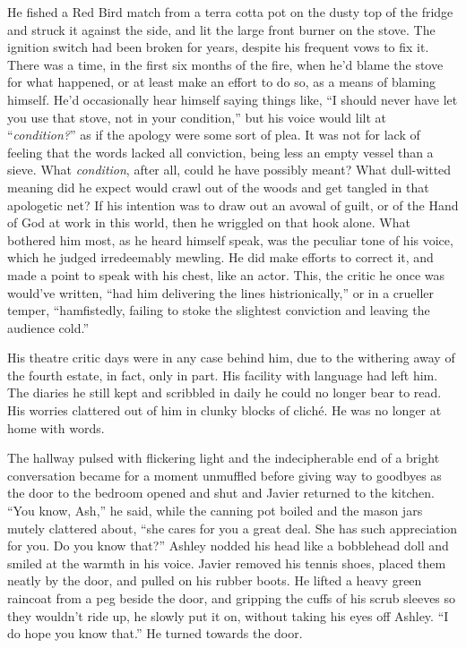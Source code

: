 \documentclass[
]{article}
\begin{document}
He fished a Red Bird match from a terra cotta pot on the dusty top of
the fridge and struck it against the side, and lit the large front
burner on the stove. The ignition switch had been broken for years,
despite his frequent vows to fix it. There was a time, in the first six
months of the fire, when he'd blame the stove for what happened, or at
least make an effort to do so, as a means of blaming himself. He'd
occasionally hear himself saying things like, ``I should never have let
you use that stove, not in your condition,'' but his voice would lilt at
``\emph{condition?}'' as if the apology were some sort of plea. It was
not for lack of feeling that the words lacked all conviction, being less
an empty vessel than a sieve. What \emph{condition}, after all, could he
have possibly meant? What dull-witted meaning did he expect would crawl
out of the woods and get tangled in that apologetic net? If his
intention was to draw out an avowal of guilt, or of the Hand of God at
work in this world, then he wriggled on that hook alone. What bothered
him most, as he heard himself speak, was the peculiar tone of his voice,
which he judged irredeemably mewling. He did make efforts to correct it,
and made a point to speak with his chest, like an actor. This, the
critic he once was would've written, ``had him delivering the lines
histrionically,'' or in a crueller temper, ``hamfistedly, failing to
stoke the slightest conviction and leaving the audience cold.''

His theatre critic days were in any case behind him, due to the
withering away of the fourth estate, in fact, only in part. His facility
with language had left him. The diaries he still kept and scribbled in
daily he could no longer bear to read. His worries clattered out of him
in clunky blocks of cliché. He was no longer at home with words.

The hallway pulsed with flickering light and the indecipherable end of a
bright conversation became for a moment unmuffled before giving way to
goodbyes as the door to the bedroom opened and shut and Javier returned
to the kitchen. ``You know, Ash,'' he said, while the canning pot boiled
and the mason jars mutely clattered about, ``she cares for you a great
deal. She has such appreciation for you. Do you know that?'' Ashley
nodded his head like a bobblehead doll and smiled at the warmth in his
voice. Javier removed his tennis shoes, placed them neatly by the door,
and pulled on his rubber boots. He lifted a heavy green raincoat from a
peg beside the door, and gripping the cuffs of his scrub sleeves so they
wouldn't ride up, he slowly put it on, without taking his eyes off
Ashley. ``I do hope you know that.'' He turned towards the door.
\end{document}
